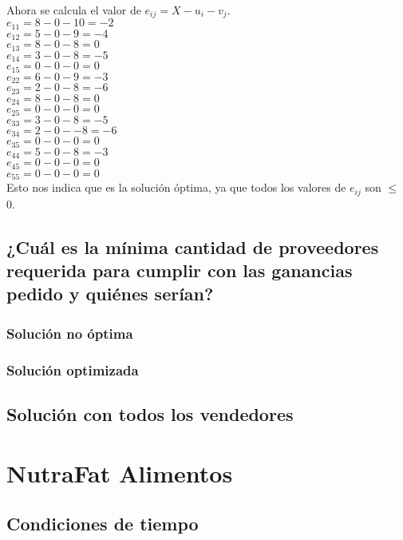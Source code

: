 \documentclass[12pt,letterpaper]{article}
\begin{document}
Ahora se calcula el valor de $e_{ij}=X-u_{i}-v_{j}$. \\

$e_{11}=8-0-10=-2$ \\
$e_{12}=5-0-9=-4$ \\
$e_{13}=8-0-8= 0$\\
$e_{14}=3-0-8=-5$ \\
$e_{15}=0-0-0=0$ \\
$e_{22}=6-0-9=-3$ \\
$e_{23}=2-0-8=-6$ \\
$e_{24}=8-0-8=0$ \\
$e_{25}=0-0-0=0$ \\
$e_{33}=3-0-8=-5$ \\
$e_{34}=2-0--8=-6$ \\
$e_{35}=0-0-0=0$ \\
$e_{44}=5-0-8=-3$ \\
$e_{45}=0-0-0=0$ \\
$e_{55}=0-0-0=0$ \\

Esto nos indica que es la solución óptima, ya que todos los valores de $e_{ij}$ son $\leq$ 0.



\subsection{¿Cuál es la mínima cantidad de proveedores requerida para cumplir con las ganancias pedido y quiénes serían?}
\subsubsection{Solución no óptima}
\subsubsection{Solución optimizada}

\subsection{Solución con todos los vendedores}
%


\section{NutraFat Alimentos}
\subsection{Condiciones de tiempo}
\end{document}
